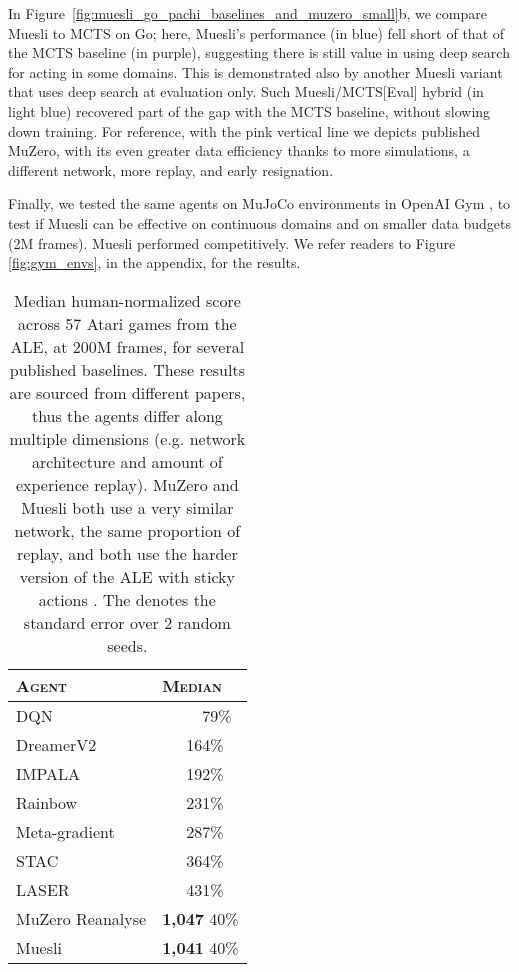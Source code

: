 \documentclass{article}
\begin{document}
In Figure~\ref{fig:muesli_go_pachi_baselines_and_muzero_small}b, we compare Muesli to MCTS on Go; here, Muesli's performance (in blue) fell short of that of the MCTS baseline (in purple), suggesting there is still value in using deep search for acting in some domains. This is demonstrated also by another Muesli variant that uses deep search at evaluation only. Such Muesli/MCTS[Eval] hybrid (in light blue) recovered part of the gap with the MCTS baseline, without slowing down training. For reference, with the pink vertical line we depicts published MuZero, with its even greater data efficiency thanks to more simulations, a different network, more replay, and early resignation.

Finally, we tested the same agents on MuJoCo environments in OpenAI Gym \citep{openai2016gym}, to test if Muesli can be effective on continuous domains and on smaller data budgets (2M frames). Muesli performed competitively. We refer readers to Figure \ref{fig:gym_envs}, in the appendix, for the results. 

\begin{table}[t]
\caption{Median human-normalized score across 57 Atari games from the ALE, at 200M frames, for several published baselines. These results are sourced from different papers, thus the agents differ along multiple dimensions (e.g. network architecture and amount of experience replay). MuZero and Muesli both use a very similar network, the same proportion of replay, and both use the harder version of the ALE with sticky actions \citep{machado2018revisiting}. The  denotes the standard error over 2 random seeds.
}
\label{tab:atari_median}
\vspace{0.1cm}
\begin{center}
\begin{small}
\begin{tabular}{ll}
\toprule
\textsc{Agent} & \textsc{Median} \\
\midrule
DQN \citep{mnih2015}    & \ \ ~~~79\%  \\
DreamerV2 \citep{hafner2020dreamerv2} & \ \ ~164\% \\
IMPALA \citep{espeholt2018impala} & \ \ ~192\%  \\
Rainbow \citep{hessel2018}    & \ \ ~231\%  \\
Meta-gradient \citep{XuHS18}    & \ \ ~287\%  \\
STAC \citep{zahavy2020selftuning}    & \ \ ~364\%  \\
LASER \citep{schmitt2020}    & \ \ ~431\%  \\
MuZero Reanalyse \citep{schrittwieser2021offline} & \textbf{1,047} 40\%  \\
Muesli    & \textbf{1,041} 40\%  \\

\bottomrule
\end{tabular}
\end{small}
\end{center}
\vskip -0.05in
\end{table}
\end{document}
